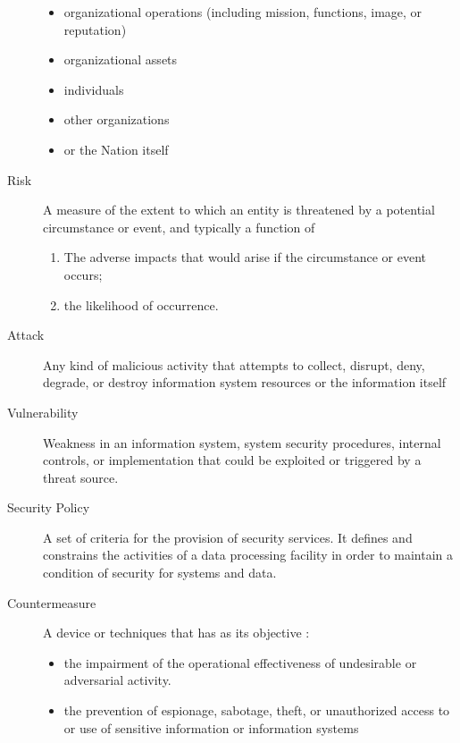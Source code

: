 \documentclass{article}
\begin{document}
\begin{description}
                                \begin{itemize}
                                    \item organizational operations (including mission, functions, image, or reputation)
                                    \item organizational assets 
                                    \item individuals
                                    \item other organizations
                                    \item or the Nation itself
                                \end{itemize}
                        \item[Risk] A measure of the extent to which an entity is threatened by a potential circumstance or event, and typically a function of 
                                \begin{enumerate}
                                    \item The adverse impacts that would arise if the circumstance or event occurs;
                                    \item the likelihood of occurrence.
                                \end{enumerate}   
                        \item[Attack] Any kind of malicious activity that attempts to collect, disrupt, deny, degrade, or destroy information system resources or the information itself
                        \item[Vulnerability] Weakness in an information system, system security procedures, internal controls, or implementation that could be exploited or triggered by a threat source.
                        \item[Security Policy] A set of criteria for the provision of security services. It defines and constrains the activities of a data processing facility in order to maintain a condition of security for systems and data.
                        \item[Countermeasure] A device or techniques that has as its objective :
                        \begin{itemize}
                            \item the impairment of the operational effectiveness of undesirable or adversarial activity.
                            \item the prevention of espionage, sabotage, theft, or unauthorized access to or use of sensitive information or information systems
                        \end{itemize}
                    \end{description}
\end{document}
